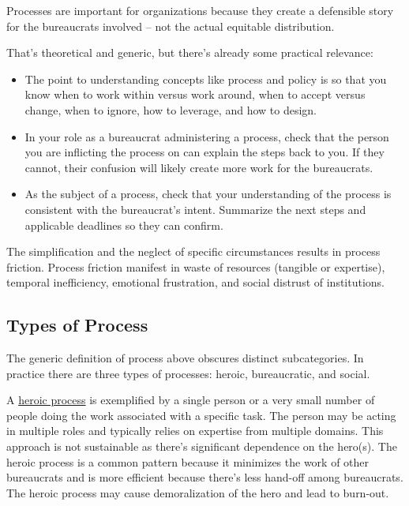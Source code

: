 Processes are important for organizations because they create a defensible story for the bureaucrats involved -- not the actual equitable distribution.

That's theoretical and generic, but there's already some practical relevance:
\begin{itemize}
\item The point to understanding concepts like process and policy is so that you know when to work within versus work around, when to accept versus change, when to ignore, how to leverage, and how to design.
    \item In your role as a bureaucrat administering a process, check that the person you are inflicting the process on can explain the steps back to you. If they cannot, their confusion will likely create more work for the bureaucrats. 
    \item As the subject of a process, check that your understanding of the process is consistent with the bureaucrat's intent. Summarize the next steps and applicable deadlines so they can confirm. 
\end{itemize}

The simplification and the neglect of specific circumstances results in process friction. Process friction manifest in waste of resources (tangible or expertise), temporal inefficiency, emotional frustration, and social distrust of institutions.



\subsection{Types of Process}
The generic definition of process above obscures distinct subcategories. In practice there are three types of processes: heroic, bureaucratic, and social.

A \underline{heroic process} is exemplified by a single person or a very small number of people doing the work associated with a specific task. The person may be acting in multiple roles and typically relies on expertise from multiple domains. This approach is not sustainable as there's significant dependence on the hero(s). The heroic process is a common pattern because it minimizes the work of other bureaucrats and is more efficient because there's less hand-off among bureaucrats. The heroic process may cause demoralization of the hero and lead to burn-out. 

